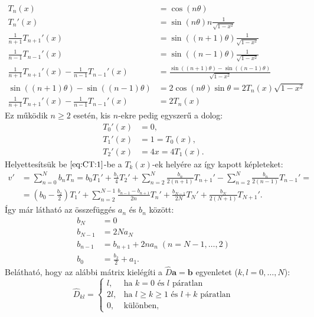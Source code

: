 \documentclass[oneside, titlepage, 12pt, a4paper]{report}
\begin{document}
\begin{align*}
T_n (x) &= \cos(n \theta) \\
T_n' (x) &= \sin(n \theta) n \frac{1}{\sqrt{1 - x^2}} \\
\frac{1}{n+1} T_{n+1}' (x) &= \sin((n+1) \theta) \frac{1}{\sqrt{1 - x^2}} \\
\frac{1}{n-1} T_{n-1}' (x) &= \sin((n-1) \theta) \frac{1}{\sqrt{1 - x^2}} \\
\frac{1}{n+1} T_{n+1}' (x) - \frac{1}{n-1} T_{n-1}' (x) &= \frac{\sin((n+1) \theta) - \sin((n-1) \theta)}{\sqrt{1 - x^2}} \\
\sin((n+1) \theta) - \sin((n-1) \theta) &= 2 \cos(n \theta) \sin\theta = 2 T_n(x) \sqrt{1 - x^2} \\
\frac{1}{n+1} T_{n+1}' (x) - \frac{1}{n-1} T_{n-1}' (x) &= 2 T_n(x)
\end{align*}
Ez működik $n \geq 2$ esetén, kis $n$-ekre pedig egyszerű a dolog:
\begin{align*}
T_0' (x) &= 0, \\
T_1' (x) &= 1 = T_0(x), \\
T_2' (x) &= 4x = 4 T_1(x).
\end{align*}
Helyettesítsük be $\eqref{eq:CT:1}$-be a $T_k(x)$-ek helyére az így kapott képleteket:
\begin{align*}
v' &= \sum_{n = 0}^N b_n T_n = b_0 T_1' + \frac{b_1}{4} T_2' + \sum_{n=2}^N \frac{b_n}{2(n+1)} T_{n+1}' - \sum_{n=2}^N \frac{b_n}{2(n-1)} T_{n-1}' = \\
 &= \left( b_0 - \frac{b_2}{2} \right) T_1' + \sum_{n=2}^{N - 1} \frac{b_{n-1} - b_{n+1}}{2n} T_n' + \frac{b_{N-1}}{2N} T_N' + \frac{b_N}{2(N+1)}T_{N+1}'.
\end{align*}
Így már látható az összefüggés $a_n$ és $b_n$ között:
\begin{align*}
b_N &= 0 \\
b_{N-1} &= 2N a_N \\
b_{n-1} &= b_{n+1} + 2n a_n \;(n = N-1, \dots, 2) \\
b_0 &= \frac{b_2}{2} + a_1.
\end{align*}
Belátható, hogy az alábbi mátrix kielégíti a $\hat{D} \mathbf{a} = \mathbf{b}$ egyenletet ($k, l = 0, \dots, N$):
\begin{equation*}
\hat{D}_{kl} =
	\begin{cases}
	l, &\text{ha } k = 0 \text{ és } l \text{ páratlan} \\
	2l, &\text{ha } l \geq k \geq 1 \text{ és } l+k \text{ páratlan} \\
	0, &\text{különben},
	\end{cases}
\end{equation*}
\end{document}
